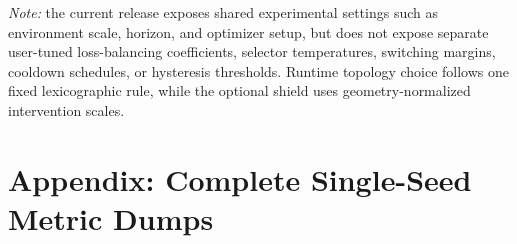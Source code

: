 \documentclass[journal]{IEEEtran}
\begin{document}
\noindent\textit{Note:} the current release exposes shared experimental
settings such as environment scale, horizon, and optimizer setup, but
does not expose separate user-tuned loss-balancing coefficients,
selector temperatures, switching margins, cooldown schedules, or
hysteresis thresholds. Runtime topology choice follows one fixed
lexicographic rule, while the optional shield uses geometry-normalized
intervention scales.

\section*{Appendix: Complete Single-Seed Metric Dumps}

\begin{table}[H]
\centering
\caption{Additional per-method metrics omitted from
.}
\label{tab:appendix_main_extra}
\scriptsize
{}
\end{table}
\end{document}
